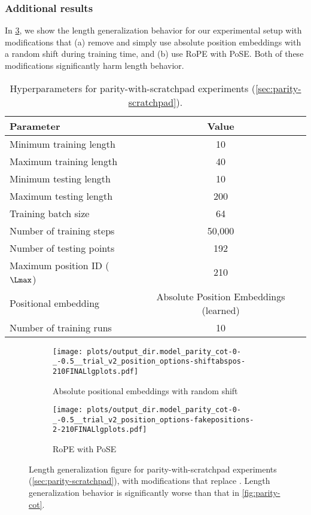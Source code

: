 \documentclass{article}
\begin{document}
\subsubsection{Additional results}
In \cref{fig:parity-cot-appendix}, we show the length generalization behavior for our experimental setup with modifications that (a) remove \predpc and simply use absolute position embeddings with a random shift during training time, and (b) use RoPE with PoSE. Both of these modifications significantly harm length \generalization behavior. 
\begin{table}[ht]
\centering
\begin{tabular}{l c}
\hline
\textbf{Parameter} & \textbf{Value} \\
\hline
Minimum training length & 10 \\
Maximum training length & 40 \\
Minimum testing length  & 10 \\
Maximum testing length  & 200 \\
Training batch size     & 64 \\
Number of training steps & 50,000 \\
Number of testing points & 192 \\
Maximum position ID ($\Lmax$) & 210 \\
  Positional embedding & Absolute Position Embeddings (learned) \\
  Number of training runs & 10\footnotemark\\
\hline
\end{tabular}
\caption{Hyperparameters for parity-with-scratchpad experiments (\cref{sec:parity-scratchpad}). }
\label{tab:parity-scratchpad-params}
\end{table}


\begin{figure}[h]
    \centering
    \begin{subfigure}[b]{0.45\textwidth}  \texttt{[image: plots/output\_dir.model\_parity\_cot-0-\_-0.5\_\_trial\_v2\_position\_options-shiftabspos-210FINALlgplots.pdf]}
      \caption{Absolute positional embeddings with random shift}
      \label{fig:parity-cot-absshift}
    \end{subfigure}
    \begin{subfigure}[b]{0.45\textwidth}
      \texttt{[image: plots/output\_dir.model\_parity\_cot-0-\_-0.5\_\_trial\_v2\_position\_options-fakepositions-2-210FINALlgplots.pdf]}
      \caption{RoPE with PoSE}
      \label{fig:parity-cot-rope-pose}
      \end{subfigure}
      \caption{Length generalization figure for parity-with-scratchpad experiments (\cref{sec:parity-scratchpad}), with modifications that replace \predpc. Length generalization behavior is significantly worse than that in \cref{fig:parity-cot}.}
    \label{fig:parity-cot-appendix}
  \end{figure}
\end{document}
